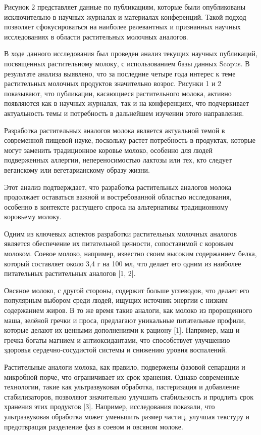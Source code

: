 \begin{multicols}{2}
Рисунок 2 представляет данные по публикациям, которые были опубликованы
исключительно в научных журналах и материалах конференций. Такой подход
позволяет сфокусироваться на наиболее релевантных и признанных научных
исследованиях в области растительных молочных аналогов.

В ходе данного исследования был проведен анализ текущих научных
публикаций, посвященных растительному молоку, с использованием базы
данных Scopus. В результате анализа выявлено, что за последние четыре
года интерес к теме растительных молочных продуктов значительно возрос.
Рисунки 1 и 2 показывают, что публикации, касающиеся растительного
молока, активно появляются как в научных журналах, так и на
конференциях, что подчеркивает актуальность темы и потребность в
дальнейшем изучении этого направления.

Разработка растительных аналогов молока является актуальной темой в
современной пищевой науке, поскольку растет потребность в продуктах,
которые могут заменить традиционное коровье молоко, особенно для людей
подверженных аллергии, непереносимостью лактозы или тех, кто следует
веганскому или вегетарианскому образу жизни.

Этот анализ подтверждает, что разработка растительных аналогов молока
продолжает оставаться важной и востребованной областью исследования,
особенно в контексте растущего спроса на альтернативы традиционному
коровьему молоку.

Одним из ключевых аспектов разработки растительных молочных аналогов
является обеспечение их питательной ценности, сопоставимой с коровьим
молоком. Соевое молоко, например, известно своим высоким содержанием
белка, который составляет около 3,4 г на 100 мл, что делает его одним из
наиболее питательных растительных аналогов {[}1, 2{]}.

Овсяное молоко, с другой стороны, содержит больше углеводов, что делает
его популярным выбором среди людей, ищущих источник энергии с низким
содержанием жиров. В то же время такие аналоги, как молоко из
пророщенного маша, зелёной гречки и проса, предлагают уникальные
питательные профили, которые делают их ценными дополнениями к рациону
{[}1{]}. Например, маш и гречка богаты магнием и антиоксидантами, что
способствует улучшению здоровья сердечно-сосудистой системы и снижению
уровня воспалений.

Растительные аналоги молока, как правило, подвержены фазовой сепарации и
микробной порче, что ограничивает их срок хранения. Однако современные
технологии, такие как ультразвуковая обработка, пастеризация и
добавление стабилизаторов, позволяют значительно улучшить стабильность и
продлить срок хранения этих продуктов {[}3{]}. Например, исследования
показали, что ультразвуковая обработка может уменьшить размер частиц,
улучшая текстуру и предотвращая разделение фаз в соевом и овсяном
молоке.


\end{multicols}
